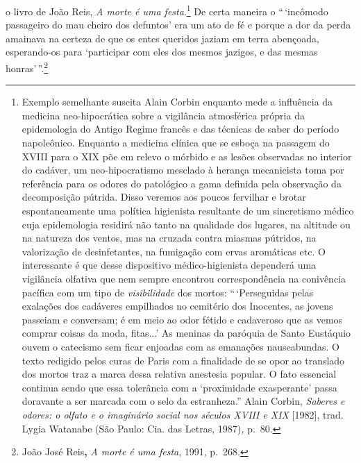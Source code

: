 o livro de João Reis, \emph{A morte é uma festa}.\footnote{Exemplo
  semelhante suscita Alain Corbin enquanto mede a influência da medicina
  neo-hipocrática sobre a vigilância atmosférica própria da epidemologia
  do Antigo Regime francês e das técnicas de saber do período
  napoleônico. Enquanto a medicina clínica que se esboça na passagem do
  XVIII para o XIX põe em relevo o mórbido e as lesões observadas no
  interior do cadáver, um neo-hipocratismo mesclado à herança
  mecanicista toma por referência para os odores do patológico a gama
  definida pela observação da decomposição pútrida. Disso veremos aos
  poucos fervilhar e brotar espontaneamente uma política higienista
  resultante de um sincretismo médico cuja epidemologia residirá não
  tanto na qualidade dos lugares, na altitude ou na natureza dos ventos,
  mas na cruzada contra miasmas pútridos, na valorização de
  desinfetantes, na fumigação com ervas aromáticas etc. O interessante é
  que desse dispositivo médico-higienista dependerá uma vigilância
  olfativa que nem sempre encontrou correspondência na conivência
  pacífica com um tipo de \emph{visibilidade} dos mortos:
  ``\,`Perseguidas pelas exalações dos cadáveres empilhados no cemitério
  dos Inocentes, as jovens passeiam e conversam; é em meio ao odor
  fétido e cadaveroso que as vemos comprar coisas da moda, fitas...' As
  meninas da paróquia de Santo Eustáquio ouvem o catecismo sem ficar
  enjoadas com as emanações nauseabundas. O texto redigido pelos curas
  de Paris com a finalidade de se opor ao translado dos mortos traz a
  marca dessa relativa anestesia popular. O fato essencial continua
  sendo que essa tolerância com a `proximidade exasperante' passa
  doravante a ser marcada com o selo da estranheza.'' Alain Corbin,
  \emph{Saberes e odores: o olfato e o imaginário social nos séculos
  XVIII e XIX} {[}1982{]}, trad. Lygia Watanabe (São Paulo: Cia. das
  Letras, 1987)\emph{,} p.~80.} De certa maneira o ``\,`incômodo
passageiro do mau cheiro dos defuntos' era um ato de fé e porque a dor
da perda amainava na certeza de que os entes queridos jaziam em terra
abençoada, esperando-os para `participar com eles dos mesmos jazigos, e
das mesmas honras'\,''.\footnote{João José Reis\textbf{,} \emph{A morte
  é uma festa}, 1991, p.~268.}

